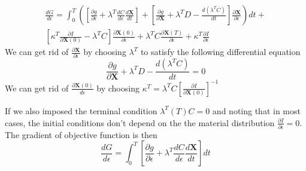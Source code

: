 \documentclass{tufte-handout}
\begin{document}
 \begin{multline}\label{lag_gradd}
 \frac{d G}{d\epsilon} = \int_{0}^{T} \left(  \left[  \frac{\partial g}{\partial \epsilon} + \lambda^T \frac{d C}{d \epsilon} \frac{d \mathbf{X}}{dt}  \right] +\left[  \frac{\partial g}{\partial \mathbf{X}}  + \lambda^T  D - \frac{ d\left(  \lambda^T C \right) }{dt}  \right]  \frac{\partial \mathbf{X}}{\partial \epsilon} \right)  dt +  \\      \left[ \kappa^T \frac{\partial I}{\partial \mathbf{X}(0)}  -\lambda^T C   \right]  \frac{\partial \mathbf{X}(0)}{\partial \epsilon} + \lambda^T C \frac{\partial \mathbf{X}(T)}{\partial \epsilon} + \kappa^T \frac{\partial I}{\partial \epsilon}
 \end{multline}
 We can get rid of $\frac{\partial \mathbf{X}}{\partial\epsilon}$  by choosing $\lambda^T$ to satisfy the following differential equation
\begin{equation}
 \frac{\partial g}{\partial \mathbf{X}}  + \lambda^T  D - \frac{ d\left(  \lambda^T C \right) }{dt} = 0
\end{equation}
We can get rid of  $\frac{\partial \mathbf{X}(0)}{d\epsilon}$  by choosing $\kappa^T = \lambda^T C \left[  \frac{\partial I}{\partial \mathbf{X}(0)}\right] ^{-1} $

If we also imposed the terminal condition $\lambda^T(T) C = 0$ and noting that in most cases, the initial conditions don't depend on the the material distribution $\frac{\partial I}{\partial \epsilon} = 0$.  The gradient of  objective function is then 
 \begin{equation}\label{lag_graddd}
 \frac{d G}{d\epsilon} = \int_{0}^{T} \left[  \frac{\partial g}{\partial \epsilon} + \lambda^T \frac{d C}{d \epsilon} \frac{d \mathbf{X}}{dt}  \right] dt 
 \end{equation}
\end{document}
